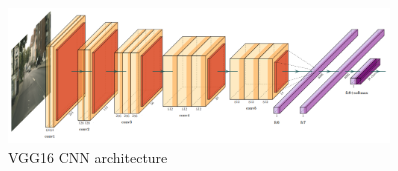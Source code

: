 \begin{figure}[H]
  \centering
  \includegraphics[width=0.9\textwidth]{figures/images/cnn_vgg.png}
  \caption[VGG16 CNN architecture]{VGG16 CNN architecture \cite{cardenas2022complex}}
  \label{fig:cnn_vgg}
\end{figure}
